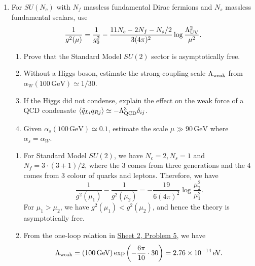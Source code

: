 \begin{enumerate}[label=\alph*)]
    \item For $SU(N_c)$ with $N_f$ massless fundamental Dirac
    fermions and $N_s$ massless fundamental scalars, use
    \begin{equation}
        \frac1{g^2(\mu)}=\frac1{g_0^2}
        -\frac{11N_c-2N_f-N_s/2}{3(4\pi)^2}
        \log\frac{\Lambda_{\rm UV}^2}{\mu^2}.
    \end{equation}
    \begin{enumerate}[label=\roman*)]
        \item Prove that the Standard Model $SU(2)$ sector is
        asymptotically free.
        \item Without a Higgs boson, estimate the strong-coupling
        scale $\Lambda_{\rm weak}$ from
        $\alpha_W(100\,\mathrm{GeV})\simeq1/30$.
        \item If the Higgs did not condense, explain the effect on
        the weak force of a QCD condensate
        $\langle\bar q_{Li}q_{Rj}\rangle
        \simeq-\Lambda_{\rm QCD}^3\delta_{ij}$.
        \item Given $\alpha_s(100\,\mathrm{GeV})\simeq0.1$,
        estimate the scale $\mu\gg90\,\mathrm{GeV}$ where
        $\alpha_s=\alpha_W$.
    \end{enumerate}
    \begin{solution}
    \begin{enumerate}[label=\roman*)]
        \item For Standard Model $SU(2)$, we have $N_c = 2, N_s = 1$ and $N_f = 3\cdot (3+1)/2$, where the $3$ comes from three generations and the $4$ comes from $3$ colour of quarks and leptons. Therefore, we have
        \begin{equation}
            \frac{1}{g^2(\mu_1)} - \frac{1}{g^2(\mu_2)} = -\frac{19}{6(4\pi)^2}\log\frac{\mu_2^2}{\mu_1^2}.
        \end{equation}
        For $\mu_1 > \mu_2$, we have $g^2(\mu_1) < g^2(\mu_2)$, and hence the theory is asymptotically free.
        \item From the one-loop relation in \href{https://luca-yucheng-jin.github.io/luca-physics-site/notes/tong-sm-sheet-2.html#sheet-2-problem-5-one-loop-qcd-scale}{Sheet 2, Problem 5}, we have
        \begin{equation}
            \Lambda_\text{weak} = (100\, {\rm GeV})\exp\left(-\frac{6\pi}{10} \cdot 30\right) = 2.76 \times 10^{-14} \, {\rm eV}.
        \end{equation}

\end{enumerate}
\end{solution}
\end{enumerate}
